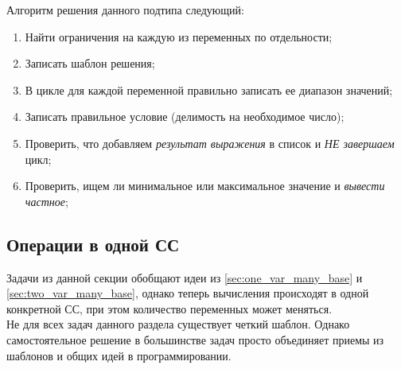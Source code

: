 \documentclass[12pt]{article}
\theoremstyle{problem_style}
\begin{document}
Алгоритм решения данного подтипа следующий:
\begin{enumerate}
    \item Найти ограничения на каждую из переменных по отдельности;
    \item Записать шаблон решения;
    \item В цикле для каждой переменной правильно записать ее диапазон значений;
    \item Записать правильное условие (делимость на необходимое число);
    \item Проверить, что добавляем \textit{результат выражения} в список и \textit{НЕ завершаем} цикл;
    \item Проверить, ищем ли минимальное или максимальное значение и \textit{вывести частное};
\end{enumerate}
\subsection{Операции в одной СС}
Задачи из данной секции обобщают идеи из \autoref{sec:one_var_many_base} и \autoref{sec:two_var_many_base}, однако теперь вычисления происходят в одной конкретной СС, при этом количество переменных может меняться.\\
Не для всех задач данного раздела существует четкий шаблон. Однако самостоятельное решение в большинстве задач просто объединяет приемы из шаблонов и общих идей в программировании.
\end{document}
